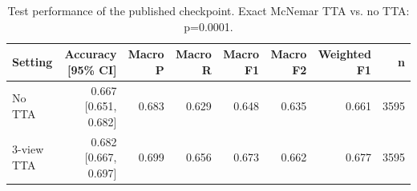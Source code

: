 \begin{table}[ht]
\centering
\small
\caption{Test performance of the published checkpoint. Exact McNemar TTA vs. no TTA: p=0.0001.}
\label{tab:global-original}
\begin{tabular}{lrrrrrrr}
\toprule
Setting & Accuracy [95\% CI] & Macro P & Macro R & Macro F1 & Macro F2 & Weighted F1 & n \\
\midrule
No TTA & 0.667 [0.651, 0.682] & 0.683 & 0.629 & 0.648 & 0.635 & 0.661 & 3595 \\
3-view TTA & 0.682 [0.667, 0.697] & 0.699 & 0.656 & 0.673 & 0.662 & 0.677 & 3595 \\
\bottomrule
\end{tabular}
\end{table}